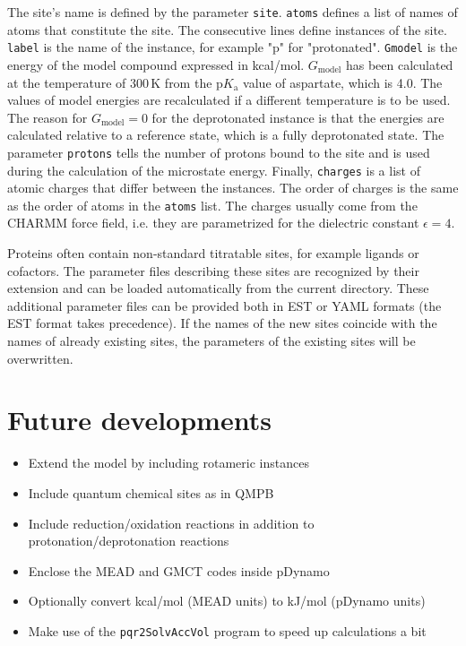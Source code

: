 \documentclass[a4paper,11pt]{article}
\newcommand{\pka}{$\mathrm{p}K_{\mathrm{a}}$\xspace}
\begin{document}
{\bigskip
The site's name is defined by the parameter \texttt{site}. 
%
\texttt{atoms} defines a list of names of atoms that constitute the site.
%
The consecutive lines define instances of the site.
%
\texttt{label} is the name of the instance, for example "p" for "protonated".
%
\texttt{Gmodel} is the energy of the model compound expressed in kcal/mol.
%
$G_{\mathrm{model}}$ has been calculated at the temperature of 300\,K from the 
\pka value of aspartate, which is 4.0.
%
The values of model energies are recalculated if a different temperature is 
to be used.
%
The reason for $G_{\mathrm{model}} = 0$ for the deprotonated instance is that 
the energies are calculated relative to a reference state, which is a fully 
deprotonated state.
%
The parameter \texttt{protons} tells the number of protons bound to the site and 
is used during the calculation of the microstate energy.
%
Finally, \texttt{charges} is a list of atomic charges that differ between 
the instances.
%
The order of charges is the same as the order of atoms in the \texttt{atoms} list.
%
The charges usually come from the CHARMM force field, i.e. they are
parametrized for the dielectric constant $\epsilon = 4$.

Proteins often contain non-standard titratable sites, for example ligands or cofactors.
%
The parameter files describing these sites are recognized by their extension and can be
loaded automatically from the current directory.
%
These additional parameter files can be provided both in EST or YAML formats (the EST format
takes precedence).
%
If the names of the new sites coincide with the names of already existing sites, the
parameters of the existing sites will be overwritten.


\section{Future developments}
\linespread{0.8}

\begin{itemize}
\itemsep0pt \parskip0pt 
  \item Extend the model by including rotameric instances
  \item Include quantum chemical sites as in QMPB
  \item Include reduction/oxidation reactions in addition to protonation/deprotonation reactions
  \item Enclose the MEAD and GMCT codes inside pDynamo
  \item Optionally convert kcal/mol (MEAD units) to kJ/mol (pDynamo units)
  \item Make use of the \texttt{pqr2SolvAccVol} program to speed up calculations a bit
\end{itemize}

}
\end{document}
